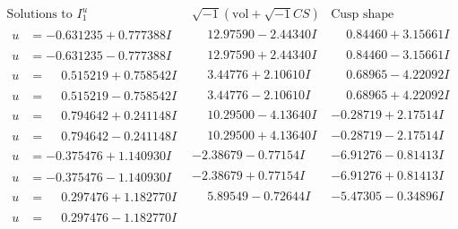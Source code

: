\documentclass[1p]{elsarticle_modified}
\theoremstyle{definition}
\newcommand{\I}{\sqrt{-1}}
\begin{document}
$$\begin{array}{c|c|c}  
\text{Solutions to }I^u_{1}& \I (\text{vol} + \sqrt{-1}CS) & \text{Cusp shape}\\
 \hline 
\begin{aligned}
u &= -0.631235 + 0.777388 I\end{aligned}
 & \phantom{-}12.97590 - 2.44340 I & \phantom{-}0.84460 + 3.15661 I \\ \hline\begin{aligned}
u &= -0.631235 - 0.777388 I\end{aligned}
 & \phantom{-}12.97590 + 2.44340 I & \phantom{-}0.84460 - 3.15661 I \\ \hline\begin{aligned}
u &= \phantom{-}0.515219 + 0.758542 I\end{aligned}
 & \phantom{-}3.44776 + 2.10610 I & \phantom{-}0.68965 - 4.22092 I \\ \hline\begin{aligned}
u &= \phantom{-}0.515219 - 0.758542 I\end{aligned}
 & \phantom{-}3.44776 - 2.10610 I & \phantom{-}0.68965 + 4.22092 I \\ \hline\begin{aligned}
u &= \phantom{-}0.794642 + 0.241148 I\end{aligned}
 & \phantom{-}10.29500 - 4.13640 I & -0.28719 + 2.17514 I \\ \hline\begin{aligned}
u &= \phantom{-}0.794642 - 0.241148 I\end{aligned}
 & \phantom{-}10.29500 + 4.13640 I & -0.28719 - 2.17514 I \\ \hline\begin{aligned}
u &= -0.375476 + 1.140930 I\end{aligned}
 & -2.38679 - 0.77154 I & -6.91276 - 0.81413 I \\ \hline\begin{aligned}
u &= -0.375476 - 1.140930 I\end{aligned}
 & -2.38679 + 0.77154 I & -6.91276 + 0.81413 I \\ \hline\begin{aligned}
u &= \phantom{-}0.297476 + 1.182770 I\end{aligned}
 & \phantom{-}5.89549 - 0.72644 I & -5.47305 - 0.34896 I \\ \hline\begin{aligned}
u &= \phantom{-}0.297476 - 1.182770 I\end{aligned}

\end{array}$$
\end{document}
